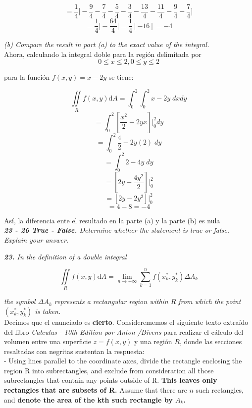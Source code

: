 \documentclass[a4paper,12pt]{article}
\begin{document}
	$$  = \frac{1}{4} \Big[ - \frac{9}{4} - \frac{7}{4} - \frac{5}{4} - \frac{3}{4}
	      - \frac{13}{4} - \frac{11}{4} - \frac{9}{4} - \frac{7}{4} \Big] $$
	$$ = \frac{1}{4} \Big[ - \frac{64}{4} \Big] = \frac{1}{4}[ -16]  = -4 $$

	\textit{ (b) Compare the result in part (a) to the exact value of the integral. }\\

		Ahora, calculando la integral doble para la región delimitada por
		$$ 0 \leq x \leq 2, 0 \leq y \leq 2  $$

		para la función $ f(x,y) = x - 2y $ se tiene:

		$$ \iint\limits_{R} f(x,y)\mathrm{d}A = \int_{0}^{2} \int_{0}^{2} x - 2y \; dx dy  $$
		$$  = \int_{0}^{2} [ \frac{x^2}{2} -2yx] \Big|_0^2 dy $$
		$$  = \int_{0}^{2} \frac{4}{2} -2y(2) \; dy $$
		$$  = \int_{0}^{2} 2 - 4y \; dy $$
		$$  = [ 2y - \frac{4y^2}{2}] \Big|_0^2 $$
		$$  = [ 2y - 2y^2 ] \Big|_0^2 $$
		$$  = 4 - 8  = - 4 $$

		Así, la diferencia ente el resultado en la parte (a) y la parte (b) es nula\\

	\textit{\textbf{23 - 26 True - False.} Determine whether the statement is
	true or false. Explain your answer.\\}

	\textit{\textbf{23.} In the definition of a double integral}

		$$  \iint\limits_{R} f(x,y)\mathrm{d}A = \lim\limits_{n \rightarrow + \infty}
		 	\sum_{k=1}^{n} f(x^{*}_{k}, y^{*}_{k}) \Delta A_{k} $$

	\textit{ the symbol $ \Delta A_{k}$ represents a rectangular region within $R$
	 		from which the point $ (x^{*}_{k}, y^{*}_{k}) $ is taken.}\\

	Decimos que el enunciado es \textbf{cierto}. Considerememos el siguiente texto extraído
	del libro \textit{Calculus - 10th Edition por Anton /Bivens} para realizar el
	cálculo del volumen entre una superficie $ z = f(x,y)$ y una región $R$, donde
	las secciones resaltadas con negritas sustentan la respuesta: \\

	- Using lines parallel to the coordinate axes, divide the rectangle
	enclosing the region R into subrectangles, and exclude from consideration
	all those subrectangles that contain any points outside of R.
	\textbf{This leaves only rectangles that are subsets of R.} Assume that there are $n$
	such rectangles, and \textbf{denote the area of the kth such rectangle by $A_k$.} \\
\end{document}
